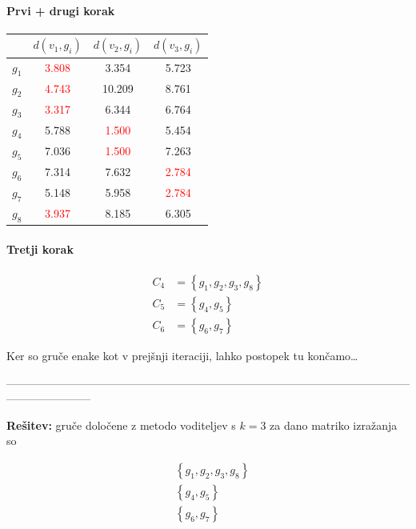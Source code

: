 \documentclass{article}
\begin{document}
\begin{enumerate}
		\paragraph{Prvi + drugi korak}

		\begin{center}
			\begin{tabular}{c||c|c|c|}
				& $d(v_1, g_i)$ & $d(v_2, g_i)$ & $d(v_3, g_i)$ \\
				\hline
				\hline
				$g_1$ & \textcolor{red}{3.808} & 3.354 & 5.723\\
				\hline
				$g_2$ & \textcolor{red}{4.743} & 10.209 & 8.761\\
				\hline
				$g_3$ & \textcolor{red}{3.317} & 6.344 & 6.764\\
				\hline
				$g_4$ & 5.788 & \textcolor{red}{1.500} & 5.454\\
				\hline
				$g_5$ & 7.036 & \textcolor{red}{1.500} & 7.263\\
				\hline
				$g_6$ & 7.314 & 7.632 & \textcolor{red}{2.784}\\
				\hline
				$g_7$ & 5.148 & 5.958 & \textcolor{red}{2.784}\\
				\hline
				$g_8$ & \textcolor{red}{3.937} & 8.185 & 6.305\\
			\end{tabular}
		\end{center}

		\paragraph{Tretji korak}

		\begin{align*}
			C_4 &= \left\{ g_1, g_2, g_3, g_8 \right\} \\
			C_5 &= \left\{ g_4, g_5 \right\} \\
			C_6 &= \left\{ g_6, g_7 \right\}
		\end{align*}

		Ker so gruče enake kot v prejšnji iteraciji, lahko postopek tu končamo\dots

		-----------------------------------------------------------------------------------------------------------------------------------

		\textbf{Rešitev:} gruče določene z metodo voditeljev s $k=3$ za dano matriko
		izražanja so

		\begin{align*}
				&\left\{ g_1, g_2, g_3, g_8 \right\}  \\
				&\left\{ g_4, g_5 \right\}  \\
				&\left\{ g_6, g_7 \right\}
		\end{align*}


\end{enumerate}
\end{document}
